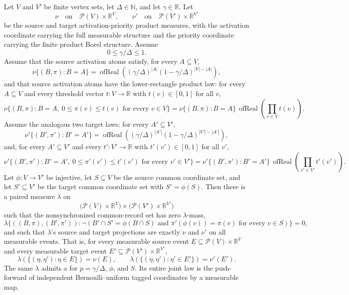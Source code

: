 \begin{helper}
Let \(V\) and \(V'\) be finite vertex sets, let \(\Delta\in\mathbb N\), and
let \(\gamma\in\mathbb R\).  Let
\[
  \nu \quad\text{on}\quad \mathcal P(V)\times\mathbb R^V,
  \qquad
  \nu' \quad\text{on}\quad \mathcal P(V')\times\mathbb R^{V'}
\]
be the source and target activation-priority product measures, with the
activation coordinate carrying the full measurable structure and the priority
coordinate carrying the finite product Borel structure.  Assume
\[
  0\le \gamma/\Delta\le 1.
\]
Assume that the source activation atoms satisfy, for every \(A\subseteq V\),
\[
  \nu\{(B,\pi):B=A\}
  =
  \operatorname{ofReal}\!\left(
    (\gamma/\Delta)^{|A|}
    (1-\gamma/\Delta)^{|V|-|A|}
  \right),
\]
and that source activation atoms have the lower-rectangle product law: for
every \(A\subseteq V\) and every threshold vector \(t:V\to\mathbb R\) with
\(t(v)\in[0,1]\) for all \(v\),
\[
  \nu\{(B,\pi):B=A,\ 0\le \pi(v)\le t(v)\text{ for every }v\in V\}
  =
  \nu\{(B,\pi):B=A\}\,
  \operatorname{ofReal}\!\left(\prod_{v\in V} t(v)\right).
\]
Assume the analogous two target laws: for every \(A'\subseteq V'\),
\[
  \nu'\{(B',\pi'):B'=A'\}
  =
  \operatorname{ofReal}\!\left(
    (\gamma/\Delta)^{|A'|}
    (1-\gamma/\Delta)^{|V'|-|A'|}
  \right),
\]
and, for every \(A'\subseteq V'\) and every \(t':V'\to\mathbb R\) with
\(t'(v')\in[0,1]\) for all \(v'\),
\[
  \nu'\{(B',\pi'):B'=A',\ 0\le \pi'(v')\le t'(v')
      \text{ for every }v'\in V'\}
  =
  \nu'\{(B',\pi'):B'=A'\}\,
  \operatorname{ofReal}\!\left(\prod_{v'\in V'} t'(v')\right).
\]
Let \(\phi:V\to V'\) be injective, let \(S\subseteq V\) be the source common
coordinate set, and let \(S'\subseteq V'\) be the target common coordinate
set with \(S'=\phi(S)\).  Then there is a paired measure
\(\lambda\) on
\[
  \bigl(\mathcal P(V)\times\mathbb R^V\bigr)
  \times
  \bigl(\mathcal P(V')\times\mathbb R^{V'}\bigr)
\]
such that the nonsynchronized common-record set has zero \(\lambda\)-mass,
\[
  \lambda\{((B,\pi),(B',\pi')):
     \neg(B'\cap S'=\phi(B\cap S)
       \text{ and }
       \pi'(\phi(v))=\pi(v)\text{ for every }v\in S)\}=0,
\]
and such that \(\lambda\)'s source and target projections are exactly
\(\nu\) and \(\nu'\) on all measurable events.  That is, for every
measurable source event \(E\subseteq\mathcal P(V)\times\mathbb R^V\) and
every measurable target event \(E'\subseteq\mathcal P(V')\times\mathbb R^{V'}\),
\[
  \lambda(\{(\eta,\eta'):\eta\in E\})=\nu(E),\qquad
  \lambda(\{(\eta,\eta'):\eta'\in E'\})=\nu'(E').
\]
The same $\lambda$ admits a
 for
$p=\gamma/\Delta$, $\phi$, and $S$. Its entire joint law is the push-forward
of independent Bernoulli--uniform tagged coordinates by a measurable map.
\end{helper}
